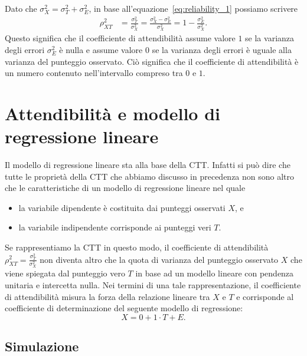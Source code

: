 Dato che  $\sigma^2_X = \sigma_T^2 + \sigma_E^2$, in base all'equazione~\ref{eq:reliability_1} possiamo scrivere
\begin{align}
\rho_{XT}^2 &=  \frac{\sigma_{T}^2}{\sigma_X^2} =\frac{\sigma_{X}^2 - \sigma^2_E}{\sigma_X^2}
 = 1-\frac{\sigma_{E}^2}{\sigma_X^2}.
\label{eq:3_2_6}
\end{align}
Questo significa che il coefficiente di attendibilità assume valore $1$ se la varianza degli errori $\sigma_{E}^2$ è nulla e assume valore $0$ se la varianza degli errori è uguale alla varianza del punteggio osservato. Ciò significa che il  coefficiente di attendibilità è un numero contenuto nell'intervallo compreso tra $0$ e $1$.

\section{Attendibilità e modello di regressione lineare}

Il modello di regressione lineare sta alla base della CTT. 
Infatti si può dire che tutte le proprietà della CTT che abbiamo discusso in precedenza non sono altro che le caratteristiche di un modello di regressione lineare nel quale 
\begin{itemize}
\item la variabile dipendente è costituita dai punteggi osservati $X$, e 
\item la variabile indipendente corrisponde ai punteggi veri $T$.
\end{itemize}

Se rappresentiamo la CTT in questo modo, il coefficiente di attendibilità
$\rho_{XT}^2 = \frac{\sigma_{T}^2}{\sigma_X^2}$ non diventa altro che la quota di varianza del punteggio osservato $X$ che viene spiegata dal punteggio vero $T$ in base ad un modello lineare con pendenza unitaria e intercetta nulla. 
Nei termini di una tale rappresentazione, il coefficiente di attendibilità misura la forza della relazione lineare tra $X$ e $T$ e corrisponde al coefficiente di determinazione del seguente modello di regressione:
\[
X = 0 + 1 \cdot T + E.
\]


\subsection{Simulazione}

